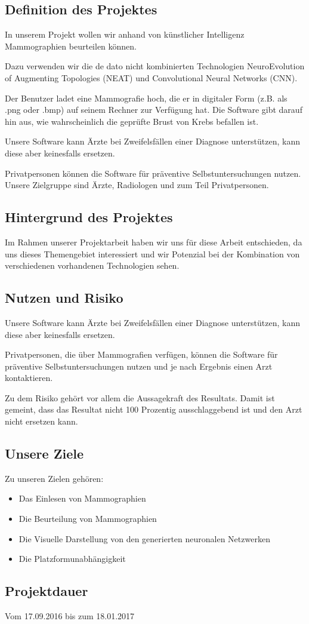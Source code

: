 \documentclass[11pt]{article}
\begin{document}
	\subsection{Definition des Projektes}
	In unserem Projekt wollen wir anhand von künstlicher Intelligenz Mammographien beurteilen können.  
	
	Dazu verwenden wir die de dato nicht kombinierten Technologien NeuroEvolution of Augmenting Topologies (NEAT) und Convolutional Neural Networks (CNN).  
	
	Der Benutzer ladet eine Mammografie hoch, die er in digitaler Form (z.B. als
	.png oder .bmp) auf seinem Rechner zur Verfügung hat. Die Software gibt
	darauf hin aus, wie wahrscheinlich die geprüfte Brust von Krebs befallen ist.  
	
	Unsere Software kann Ärzte bei Zweifelsfällen einer Diagnose unterstützen,
	kann diese aber keinesfalls ersetzen.  
	
	Privatpersonen können die Software für
	präventive Selbstuntersuchungen nutzen.
	Unsere Zielgruppe sind Ärzte, Radiologen und zum Teil Privatpersonen.

	
	\subsection{Hintergrund des Projektes}
	Im Rahmen unserer Projektarbeit haben wir uns für diese Arbeit entschieden, da uns dieses Themengebiet interessiert und wir Potenzial bei der Kombination von verschiedenen vorhandenen Technologien sehen.  

	\subsection{Nutzen und Risiko}
	Unsere Software kann Ärzte bei Zweifelsfällen einer Diagnose unterstützen,
	kann diese aber keinesfalls ersetzen.  
	
	Privatpersonen, die über Mammografien verfügen, können die Software für
	präventive Selbstuntersuchungen nutzen und je nach Ergebnis einen Arzt
	kontaktieren.  
	
	Zu dem Risiko gehört vor allem die Aussagekraft des Resultats. Damit ist gemeint, dass das Resultat nicht 100 Prozentig ausschlaggebend ist und den Arzt nicht ersetzen kann.  
	\newpage
	\subsection{Unsere Ziele}
	Zu unseren Zielen gehören:  
	
	\begin{itemize}
		\item{Das Einlesen von Mammographien}
		\item{Die Beurteilung von Mammographien}
		\item{Die Visuelle Darstellung von den generierten neuronalen Netzwerken}
		\item{Die Platzformunabhängigkeit}
	\end{itemize}
	\subsection{Projektdauer}
	Vom 17.09.2016 bis zum 18.01.2017
	
	
\end{document}
